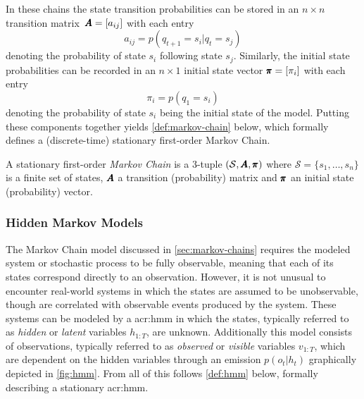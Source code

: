 In these chains the state transition probabilities can be stored in an $n \times n$ transition matrix~$\pmb{A} = [a_{ij}]$ with each entry
\begin{equation}
a_{ij} = p(q_{t+1} = s_i\vert q_t = s_j)
\end{equation}
denoting the probability of state $s_i$ following state $s_j$.
Similarly, the initial state probabilities can be recorded in an $n \times 1$ initial state vector $\pmb{\pi} = [\pi_i]$ with each entry
\begin{equation}
\pi_i = p(q_1 = s_i)
\end{equation} 
denoting the probability of state $s_i$ being the initial state of the model.
Putting these components together yields \autoref{def:markov-chain} below, which formally defines a (discrete-time) stationary first-order Markov Chain.

\begin{definition}
	\label{def:markov-chain}
	A stationary first-order \textit{Markov Chain} is a 3-tuple $(\mathcal{S}, \pmb{A}, \pmb{\pi})$ where $\mathcal{S} = \{s_1, \ldots, s_n\}$ is a finite set of states, $\pmb{A}$ a transition (probability) matrix and $\pmb{\pi}$ an initial state (probability) vector.
\end{definition}

\newpage

\subsubsection{Hidden Markov Models}
\label{sec:hidden-markov-models}

The Markov Chain model discussed in \autoref{sec:markov-chains} requires the modeled system or stochastic process to be fully observable, meaning that each of its states correspond directly to an observation.
However, it is not unusual to encounter real-world systems in which the states are assumed to be unobservable, though are correlated with observable events produced by the system.
These systems can be modeled by a \acrfull{acr:hmm} in which the states, typically referred to as \textit{hidden} or \textit{latent} variables $h_{1:T}$, are unknown.
Additionally this model consists of observations, typically referred to as \textit{observed} or \textit{visible} variables $v_{1:T}$, which are dependent on the hidden variables through an emission $p(o_t\vert h_t)$ graphically depicted in \autoref{fig:hmm}. From all of this follows \autoref{def:hmm} below, formally describing a stationary \acrshort{acr:hmm}.


